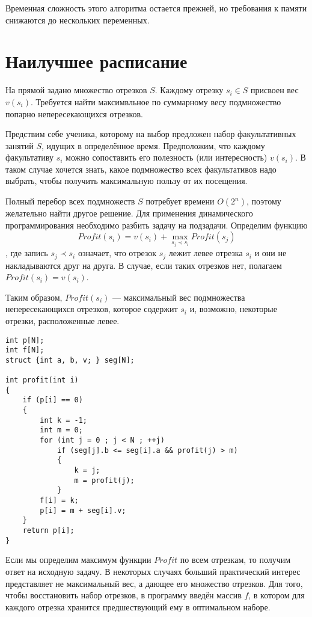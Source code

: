 \documentclass[14pt,openany]{book}
\begin{document}
Временная сложность этого алгоритма остается прежней, но требования к памяти снижаются
до нескольких переменных.

\section{Наилучшее расписание}

На прямой задано множество отрезков $S$. Каждому отрезку $s_i \in S$ присвоен вес $v(s_i)$.
Требуется найти максимвльное по суммарному весу подмножество попарно непересекающихся отрезков.

Предствим себе ученика, которому на выбор предложен набор факультативных занятий $S$, идущих
в определённое время. Предположим, что каждому факультативу $s_i$ можно сопоставить
его полезность (или интересность) $v(s_i)$. В таком случае хочется знать, какое подмножество
всех факультативов надо выбрать, чтобы получить максимальную пользу от их посещения.

Полный перебор всех подмножеств $S$ потребует времени $O(2^n)$, поэтому желательно найти другое
решение. Для применения динамического программирования необходимо разбить задачу на подзадачи.
Определим функцию
$$Profit(s_i) = v(s_i) + \max_{s_j \prec s_i}Profit(s_j)$$,
где запись $s_j \prec s_i$ означает, что отрезок $s_j$ лежит левее отрезка $s_i$ и они
не накладываются друг на друга. В случае, если таких отрезков нет, полагаем
$Profit(s_i) = v(s_i)$.

Таким образом, $Profit(s_i)$ --- максимальный вес подмножества непересекающихся отрезков,
которое содержит $s_i$ и, возможно, некоторые отрезки, расположенные левее.

\begin{lstlisting}
int p[N];
int f[N];
struct {int a, b, v; } seg[N];

int profit(int i)
{
    if (p[i] == 0)
    {
        int k = -1;
        int m = 0;
        for (int j = 0 ; j < N ; ++j)
            if (seg[j].b <= seg[i].a && profit(j) > m)
            {
                k = j;
                m = profit(j);
            }
        f[i] = k;
        p[i] = m + seg[i].v;
    }
    return p[i];
}
\end{lstlisting}

Если мы определим максимум функции $Profit$ по всем отрезкам, то получим ответ на исходную задачу.
В некоторых случаях больший практический интерес представляет не максимальный вес, а дающее его
множество отрезков. Для того, чтобы восстановить набор отрезков, в программу введён массив $f$,
в котором для каждого отрезка хранится предшествующий ему в оптимальном наборе.
\end{document}
